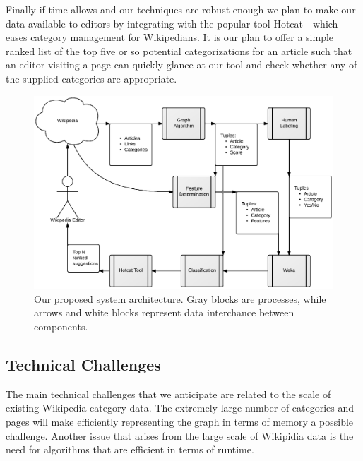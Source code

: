\documentclass{sig-alternate}
\begin{document}
Finally if time allows and our techniques are robust enough we plan to make our data available to editors by integrating with the popular tool Hotcat---which eases category management for Wikipedians. It is our plan to offer a simple ranked list of the top five or so potential categorizations for an article such that an editor visiting a page can quickly glance at our tool and check whether any of the supplied categories are appropriate.
\begin{figure}[htb!]
	\begin{center}
		\includegraphics[width=1.0\linewidth]{block_diagram}
	\end{center}
	\vspace{-12pt}
	\caption{Our proposed system architecture. Gray blocks are processes, while arrows and white blocks represent data interchance between components.}
	\label{fig:block_diagram}
\end{figure}

\subsection{Technical Challenges}
\label{subsec:tech_challenges}
The main technical challenges that we anticipate are related to the scale of existing Wikipedia category data. The extremely large number of categories and pages will make efficiently representing the graph in terms of memory a possible challenge. Another issue that arises from the large scale of Wikipidia data is the need for algorithms that are efficient in terms of runtime. 
\end{document}
